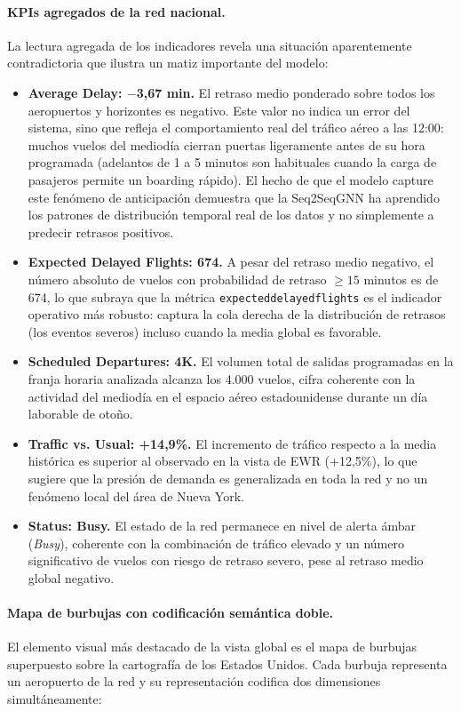 \documentclass[12pt,oneside,a4paper]{report}
\renewcommand{\_}{\textunderscore\allowbreak}
\begin{document}
\paragraph{KPIs agregados de la red nacional.}
La lectura agregada de los indicadores revela una situación aparentemente contradictoria que ilustra un matiz importante del modelo:

\begin{itemize}
    \item \textbf{Average Delay: $-$3,67 min.} El retraso medio ponderado sobre todos los aeropuertos y horizontes es negativo. Este valor no indica un error del sistema, sino que refleja el comportamiento real del tráfico aéreo a las 12:00: muchos vuelos del mediodía cierran puertas ligeramente antes de su hora programada (adelantos de 1 a 5 minutos son habituales cuando la carga de pasajeros permite un boarding rápido). El hecho de que el modelo capture este fenómeno de anticipación demuestra que la Seq2SeqGNN ha aprendido los patrones de distribución temporal real de los datos y no simplemente a predecir retrasos positivos.
    \item \textbf{Expected Delayed Flights: 674.} A pesar del retraso medio negativo, el número absoluto de vuelos con probabilidad de retraso $\geq 15$ minutos es de 674, lo que subraya que la métrica \texttt{expected\_delayed\_flights} es el indicador operativo más robusto: captura la cola derecha de la distribución de retrasos (los eventos severos) incluso cuando la media global es favorable.
    \item \textbf{Scheduled Departures: 4K.} El volumen total de salidas programadas en la franja horaria analizada alcanza los 4.000 vuelos, cifra coherente con la actividad del mediodía en el espacio aéreo estadounidense durante un día laborable de otoño.
    \item \textbf{Traffic vs. Usual: +14,9\%.} El incremento de tráfico respecto a la media histórica es superior al observado en la vista de EWR (+12,5\%), lo que sugiere que la presión de demanda es generalizada en toda la red y no un fenómeno local del área de Nueva York.
    \item \textbf{Status: Busy.} El estado de la red permanece en nivel de alerta ámbar (\textit{Busy}), coherente con la combinación de tráfico elevado y un número significativo de vuelos con riesgo de retraso severo, pese al retraso medio global negativo.
\end{itemize}

\paragraph{Mapa de burbujas con codificación semántica doble.}
El elemento visual más destacado de la vista global es el mapa de burbujas superpuesto sobre la cartografía de los Estados Unidos. Cada burbuja representa un aeropuerto de la red y su representación codifica dos dimensiones simultáneamente:
\end{document}
